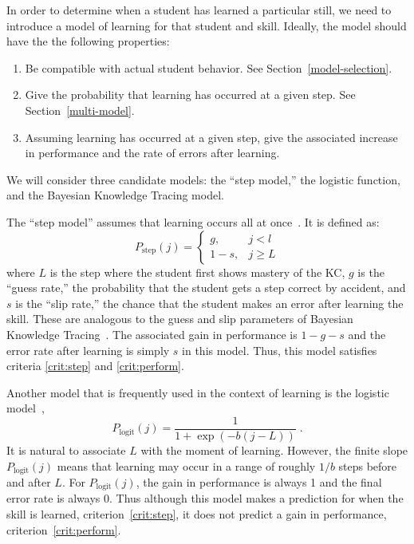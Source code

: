 \documentclass{acmlarge-edm}
\begin{document}
In order to determine when a student has learned a particular still,
we need to introduce a model of learning for that student and skill.
Ideally, the model should have the the following properties:
\label{model-criteria}
%
\begin{enumerate} 

\item Be compatible with actual student behavior.
      See Section~\ref{model-selection}.

\item \label{crit:step}
      Give the probability that learning has occurred at a given step.
      See Section~\ref{multi-model}.

\item  \label{crit:perform}
      Assuming learning has occurred at a given step, give the 
     associated increase in performance and 
     the rate of errors after learning.

\end{enumerate}
%
We will consider three candidate models:  the ``step model,'' 
the logistic function, and the Bayesian Knowledge Tracing model.

The ``step model'' assumes that learning occurs all at 
once~\cite{baker_detecting_2011}.  It is defined as:
%
\begin{equation}
    P_\mathrm{step}(j)= \left\{\begin{array}{cc}
                 g, & j<l \\
                 1-s, & j\ge L 
                 \end{array} \right. 
\end{equation}
%
where $L$ is the step where the student first shows mastery of the
KC, $g$ is the ``guess rate,'' the probability that the student
gets a step correct by accident, and $s$ is the ``slip rate,''
the chance that the student makes an error after learning
the skill.  These are analogous to the guess and slip parameters 
of Bayesian Knowledge Tracing~\cite{corbett_knowledge_1994}.  
The associated gain in performance
is $1-g-s$ and the error rate after learning is simply $s$ in this
model.  Thus, this model satisfies criteria \ref{crit:step} and
\ref{crit:perform}.

Another model that is frequently used in the context of 
learning is the logistic model~\cite{cen_learning_2006,min_chi_instructional_2011},
%
\begin{equation}
    P_\mathrm{logit}(j)= \frac{1}{1+\exp\left(-b (j-L)\right)} \; .
\end{equation}
%
It is natural to associate $L$ with the moment of learning.  However,
the finite slope $P_\mathrm{logit}(j)$ means that learning may occur
in a range of roughly $1/b$ steps before and after $L$.    For  
$P_\mathrm{logit}(j)$, the gain in performance is always 1 and the final error
rate is always 0.  Thus although this model makes a prediction for
when the skill is learned, criterion~\ref{crit:step}, it does
not predict a gain in performance, criterion~\ref{crit:perform}.
\end{document}
